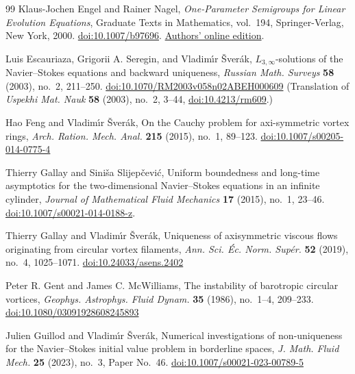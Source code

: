 \begin{thebibliography}{99}
Klaus-Jochen Engel and Rainer Nagel,
\emph{One-Parameter Semigroups for Linear Evolution Equations},
Graduate Texts in Mathematics, vol.~194, Springer-Verlag,
New York, 2000.
\href{https://doi.org/10.1007/b97696}{doi:10.1007/b97696}.
\href{https://www.math.uni-tuebingen.de/de/forschung/agfa/members/engel-nagel_one-parameter-semigroups.pdf}{Authors' online edition}.

Luis Escauriaza, Grigorii A. Seregin, and Vladim\'{\i}r \v{S}ver\'{a}k, $L_{3,\infty}$-solutions of the
Navier--Stokes equations and backward uniqueness, \emph{Russian Math. Surveys} \textbf{58} (2003),
no.~2, 211--250.
\href{https://doi.org/10.1070/RM2003v058n02ABEH000609}{doi:10.1070/RM2003v058n02ABEH000609}
(Translation of \emph{Uspekhi Mat. Nauk} \textbf{58} (2003), no.~2, 3--44,
\href{https://doi.org/10.4213/rm609}{doi:10.4213/rm609}.)

Hao Feng and Vladim\'{\i}r \v{S}ver\'{a}k, On the Cauchy problem for axi-symmetric vortex rings,
\emph{Arch. Ration. Mech. Anal.} \textbf{215} (2015), no.~1, 89--123.
\href{https://doi.org/10.1007/s00205-014-0775-4}{doi:10.1007/s00205-014-0775-4}

Thierry Gallay and Sini\v{s}a Slijep\v{c}evi\'{c},
Uniform boundedness and long-time asymptotics for the two-dimensional
Navier--Stokes equations in an infinite cylinder,
\emph{Journal of Mathematical Fluid Mechanics} \textbf{17} (2015),
no.~1, 23--46.
\href{https://doi.org/10.1007/s00021-014-0188-z}{doi:10.1007/s00021-014-0188-z}.

Thierry Gallay and Vladim\'{\i}r \v{S}ver\'{a}k, Uniqueness of axisymmetric viscous flows originating
from circular vortex filaments, \emph{Ann. Sci. \'{E}c. Norm. Sup\'{e}r.} \textbf{52} (2019), no.~4,
1025--1071.
\href{https://doi.org/10.24033/asens.2402}{doi:10.24033/asens.2402}

Peter R. Gent and James C. McWilliams, The instability of barotropic circular vortices,
\emph{Geophys. Astrophys. Fluid Dynam.} \textbf{35} (1986), no.~1--4, 209--233.
\href{https://doi.org/10.1080/03091928608245893}{doi:10.1080/03091928608245893}

Julien Guillod and Vladim\'{\i}r \v{S}ver\'{a}k, Numerical investigations of non-uniqueness for the
Navier--Stokes initial value problem in borderline spaces, \emph{J. Math. Fluid Mech.} \textbf{25}
(2023), no.~3, Paper No.~46.
\href{https://doi.org/10.1007/s00021-023-00789-5}{doi:10.1007/s00021-023-00789-5}


\end{thebibliography}
